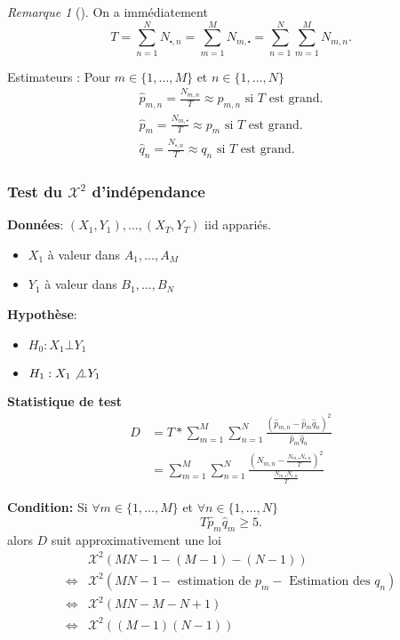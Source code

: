 \documentclass{article}
\theoremstyle{plain}%
\theoremstyle{definition}
\theoremstyle{remark}
\newtheorem*{rem}{Remarque}
\begin{document}
\begin{rem}[]
    On a immédiatement 
    \[
        T = \sum_{n=1}^{N}N_{\centerdot, n} = \sum_{m=1}^{M}N_{m,\centerdot} = \sum_{n=1}^{N}\sum_{m=1}^{M}N_{m,n}
    .\]
\end{rem}
Estimateurs : Pour $ m \in \{1, \dots, M\} $ et $ n \in \{1,\dots, N\} $ 
\begin{align*}
    \hat{p}_{m,n} = \frac{N_{m,n}}{T} \approx p_{m,n} \text{ si } T \text{ est grand.} \\
    \hat{p}_{m} = \frac{N_{m, \centerdot}}{T} \approx p_m \text{ si } T \text{ est grand.} \\
    \hat{q}_{n} = \frac{N_{\centerdot,n}}{T} \approx q_n \text{ si } T \text{ est grand.}
\end{align*}


\subsubsection{Test du $ \mathcal{X}^2 $ d'indépendance}
\textbf{Données}: $ (X_1, Y_1), \dots, (X_T, Y_T) $ iid appariés. \begin{itemize}
    \item $ X_1 $ à valeur dans $ A_1, \dots, A_M $ 
    \item $ Y_1 $ à valeur dans $ B_1, \dots, B_N $ 
\end{itemize}

\textbf{Hypothèse}: 
\begin{itemize}
    \item $ H_0: X_1 \bot Y_1 $
    \item $ H_1: X_1 \not\bot Y_1 $
\end{itemize}

\textbf{Statistique de test}
\begin{align*}
    D &= T * \sum_{m=1}^{M}\sum_{n=1}^{N}\frac{(\hat{p}_{m,n} - \hat{p}_m \hat{q}_n)^2}{\hat{p}_m \hat{q}_n} \\
        &= \sum_{m=1}^{M}\sum_{n=1}^{N}\frac{( N_{m,n} - \frac{N_{m, \centerdot} N_{\centerdot, n}}{T})^2}{\frac{N_{m, \centerdot} N_{\centerdot, n}}{T}}
\end{align*}

\textbf{Condition:}
Si $ \forall m \in \{1,\dots, M\} $ et $ \forall n \in \{1, \dots, N\} $ 
\[
    T \hat{p}_m \hat{q}_m \geq 5
.\]
alors $ D $ suit approximativement une loi 
\begin{align*}
    &\mathcal{X}^2  (MN - 1 - (M-1) - (N-1)) \\
    \Leftrightarrow &\mathcal{X}^2  (MN - 1 - \text{ estimation de } p_m - \text{ Estimation des } q_n) \\
    \Leftrightarrow & \mathcal{X}^2 (MN-M-N+1) \\
    \Leftrightarrow & \mathcal{X}^2 ((M-1)(N-1))
\end{align*}
\end{document}
